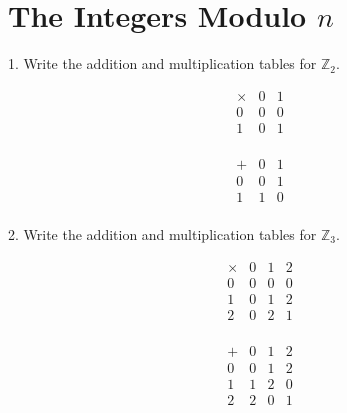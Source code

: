 \documentclass{article}
\begin{document}
\section{The Integers Modulo $n$}

\begin{exercise}{}{}
	{1. Write the addition and multiplication tables for $\mathbb{Z}_2$.}
	\begin{alist}
		\item
		\[
			\begin{array}{c|cc}
				\times & 0 & 1 \\
				\hline
				0      & 0 & 0 \\
				1      & 0 & 1 \\
			\end{array}
		\]
		\item
		\[
			\begin{array}{c|cc}
				+ & 0 & 1 \\
				\hline
				0 & 0 & 1 \\
				1 & 1 & 0 \\
			\end{array}
		\]
	\end{alist}
\end{exercise}

\begin{exercise}{}{}
	{2. Write the addition and multiplication tables for $\mathbb{Z}_3$.}
	\begin{alist}
		\item \[
			\begin{array}{c|ccc}
				\times & 0 & 1 & 2 \\
				\hline
				0      & 0 & 0 & 0 \\
				1      & 0 & 1 & 2 \\
				2      & 0 & 2 & 1 \\
			\end{array}
		\]
		\item \[
			\begin{array}{c|ccc}
				+ & 0 & 1 & 2 \\
				\hline
				0 & 0 & 1 & 2 \\
				1 & 1 & 2 & 0 \\
				2 & 2 & 0 & 1 \\
			\end{array}
		\]
	\end{alist}
\end{exercise}{}{}
\end{document}
